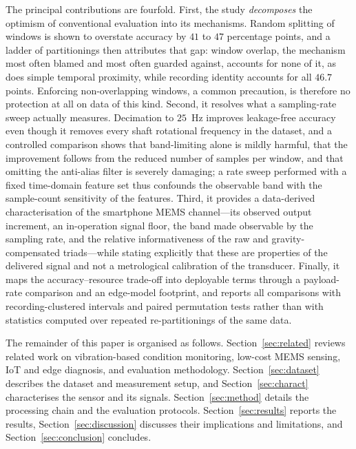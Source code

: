 The principal contributions are fourfold. First, the study \emph{decomposes} the
optimism of conventional evaluation into its mechanisms. Random splitting of
windows is shown to overstate accuracy by $41$ to $47$ percentage points, and a
ladder of partitionings then attributes that gap: window overlap, the mechanism
most often blamed and most often guarded against, accounts for none of it, as does
simple temporal proximity, while recording identity accounts for all $46.7$
points. Enforcing non-overlapping windows, a common precaution, is therefore no
protection at all on data of this kind. Second, it resolves what a sampling-rate
sweep actually measures. Decimation to $25$~Hz improves leakage-free accuracy even
though it removes every shaft rotational frequency in the dataset, and a
controlled comparison shows that band-limiting alone is mildly harmful, that the
improvement follows from the reduced number of samples per window, and that
omitting the anti-alias filter is severely damaging; a rate sweep performed with a
fixed time-domain feature set thus confounds the observable band with the
sample-count sensitivity of the features. Third, it provides a data-derived
characterisation of the smartphone MEMS channel---its observed output increment,
an in-operation signal floor, the band made observable by the sampling rate, and
the relative informativeness of the raw and gravity-compensated triads---while
stating explicitly that these are properties of the delivered signal and not a
metrological calibration of the transducer. Finally, it maps the
accuracy--resource trade-off into deployable terms through a payload-rate
comparison and an edge-model footprint, and reports all comparisons with
recording-clustered intervals and paired permutation tests rather than with
statistics computed over repeated re-partitionings of the same data.

The remainder of this paper is organised as follows.
Section~\ref{sec:related} reviews related work on vibration-based condition
monitoring, low-cost MEMS sensing, IoT and edge diagnosis, and evaluation
methodology. Section~\ref{sec:dataset} describes the dataset and measurement
setup, and Section~\ref{sec:charact} characterises the sensor and its signals.
Section~\ref{sec:method} details the processing chain and the evaluation
protocols. Section~\ref{sec:results} reports the results,
Section~\ref{sec:discussion} discusses their implications and limitations, and
Section~\ref{sec:conclusion} concludes.
